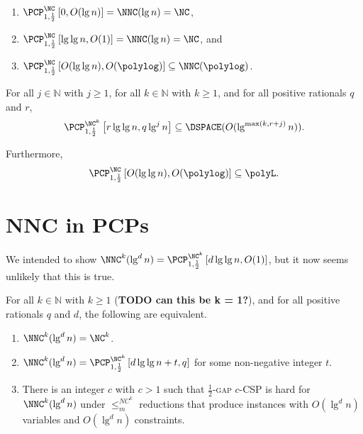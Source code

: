 \documentclass[]{article}
\newcommand{\PCPcs}[5]{\PCP^{#1}_{#2, #3}\left[#4, #5\right]}
\begin{document}
\begin{corollary}\label{cor:pcpinnnc}
  \mbox{}
  \begin{enumerate}
  \item $\PCPcs{\NC}{1}{\frac{1}{2}}{0}{O(\lg n)} = \NNC(\lg n) = \NC$,
  \item $\PCPcs{\NC}{1}{\frac{1}{2}}{\lg \lg n}{O(1)} = \NNC(\lg n) = \NC$, and
  \item $\PCPcs{\NC}{1}{\frac{1}{2}}{O(\lg \lg n)}{O(\polylog)} \subseteq \NNC(\polylog)$.
  \end{enumerate}
\end{corollary}

\begin{corollary}
  For all $j \in \mathbb{N}$ with $j \geq 1$, for all $k \in \mathbb{N}$ with $k \geq 1$, and for all positive rationals $q$ and $r$,
  \begin{equation*}
    \PCPcs{\NC^k}{1}{\frac{1}{2}}{r \lg \lg n}{q \lg^j n} \subseteq \DSPACE(O(\lg^{\max(k, r + j)} n)).
  \end{equation*}

  Furthermore,
  \begin{equation*}
    \PCPcs{\NC}{1}{\frac{1}{2}}{O(\lg \lg n)}{O(\polylog)} \subseteq \polyL.
  \end{equation*}
\end{corollary}

\section{NNC in PCPs}

We intended to show $\NNC^k(\lg^d n) = \PCPcs{\NC^k}{1}{\frac{1}{2}}{d \lg \lg n}{O(1)}$, but it now seems unlikely that this is true.

\begin{theorem}\label{thm:equiv}
  For all $k \in \mathbb{N}$ with $k \geq 1$ (\textbf{TODO can this be k = 1?}), and for all positive rationals $q$ and $d$, the following are equivalent.
  \begin{enumerate}
  \item $\NNC^k(\lg^d n) = \NC^k$.
  \item $\NNC^k(\lg^d n) = \PCPcs{\NC^k}{1}{\frac{1}{2}}{d \lg \lg n + t}{q}$ for some non-negative integer $t$.
  \item There is an integer $c$ with $c > 1$ such that \textsc{$\frac{1}{2}$-gap $c$-CSP} is hard for $\NNC^k(\lg^d n)$ under $\leq_m^{NC^k}$ reductions that produce instances with $O(\lg^d n)$ variables and $O(\lg^d n)$ constraints.
  \end{enumerate}
\end{theorem}
\end{document}
